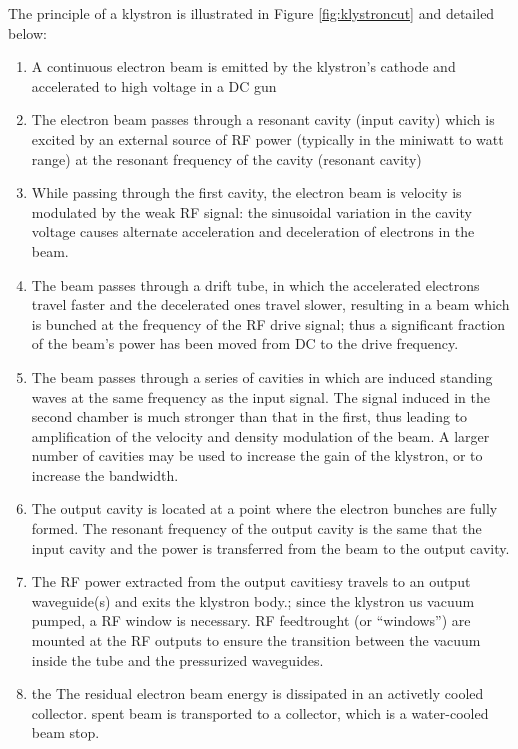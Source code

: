 The principle of a klystron is illustrated in Figure \ref{fig:klystroncut} \parencite{Tenenbaum2003} and detailed below:

\begin{enumerate}
 \item  A continuous electron beam is emitted by the klystron's cathode and accelerated to high voltage in a DC gun 
 \item The electron beam passes through a resonant cavity (input cavity) which is excited by an external source of RF power (typically in the miniwatt to watt range) at the resonant frequency of the cavity (resonant cavity) 
\item While passing through the first cavity, the electron beam is velocity is modulated by the weak RF signal: the sinusoidal variation in the cavity voltage causes alternate acceleration and deceleration of electrons in the beam. 
\item The beam passes through a drift tube, in which the accelerated electrons travel faster and the decelerated ones travel slower, resulting in a beam which is bunched at the frequency of the RF drive signal; thus a significant fraction of the beam’s power has been moved from DC to the drive frequency. 
\item The beam passes through a series of cavities in which are induced standing waves at the same frequency as the input signal. The signal induced in the second chamber is much stronger than that in the first, thus leading to amplification of the velocity and density modulation of the beam. A larger number of cavities may be used to increase the gain of the klystron, or to increase the bandwidth. 
\item The output cavity is located at a point where the electron bunches are fully formed. The resonant frequency of the output cavity is the same that the input cavity and the power is transferred from the beam to the output cavity. 
\item The RF power extracted from the output cavitiesy travels to an output waveguide(s) and exits the klystron body.;  since the klystron us vacuum pumped, a RF window is necessary. RF feedtrought (or “windows”) are mounted at the RF outputs to ensure the transition between the vacuum inside the tube and the pressurized waveguides.
\item the The residual electron beam energy is dissipated in an activetly cooled collector. spent beam is transported to a collector, which is a water-cooled beam stop. 
\end{enumerate}

